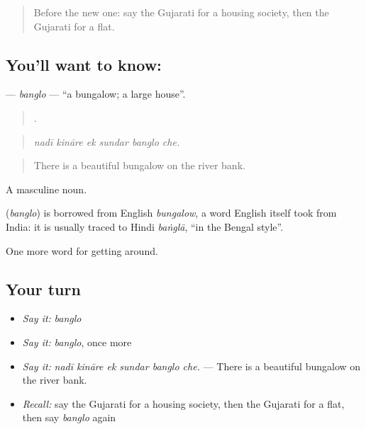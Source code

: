 \begin{quote}
Before the new one: say the Gujarati for a housing society, then the Gujarati for a flat.
\end{quote}

\subsection*{You'll want to know: }
\textbf{} — \emph{banglo} — \textquotedblleft{}a bungalow; a large house\textquotedblright{}.

\begin{quote}
     .
\end{quote}

\begin{quote}
\emph{nadī kināre ek sundar banglo che.}
\end{quote}

\begin{quote}
There is a beautiful bungalow on the river bank.
\end{quote}

A masculine noun.

\begin{cousinweb}
\textbf{} (\emph{banglo}) is borrowed from English \emph{bungalow}, a word English itself took from India: it is usually traced to Hindi \emph{baṅglā}, \textquotedblleft{}in the Bengal style\textquotedblright{}.
\end{cousinweb}

\begin{grammarlens}[title={What you've built}]
One more word for getting around.
\end{grammarlens}

\subsection*{Your turn}
\begin{itemize}
\raggedright
  \item \emph{Say it:} \emph{banglo}
  \item \emph{Say it:} \emph{banglo}, once more
  \item \emph{Say it:} \emph{nadī kināre ek sundar banglo che.} — There is a beautiful bungalow on the river bank.
  \item \emph{Recall:} say the Gujarati for a housing society, then the Gujarati for a flat, then say \emph{banglo} again
\end{itemize}

